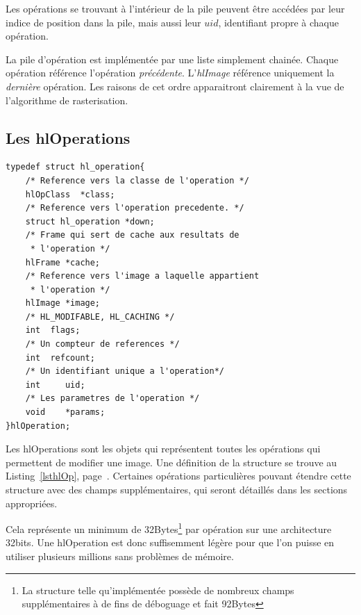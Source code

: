 			Les opérations se trouvant à l'intérieur de la pile peuvent être accédées par leur indice de position dans la pile, mais aussi leur
			$uid$, identifiant propre à chaque opération. 

			La pile d'opération est implémentée par une liste simplement chainée. Chaque opération référence l'opération \emph{précédente}.
			L'\emph{hlImage} référence uniquement la \emph{dernière} opération. Les raisons de cet ordre apparaitront clairement à la vue
			de l'algorithme de rasterisation.

		\subsection{Les hlOperations}
		\begin{lstlisting}[float,caption={Définition des hlOperations },frame=tb,label=lsthlOp]
typedef struct hl_operation{
	/* Reference vers la classe de l'operation */
	hlOpClass  *class;	
	/* Reference vers l'operation precedente. */
	struct hl_operation *down;
	/* Frame qui sert de cache aux resultats de 
	 * l'operation */
	hlFrame *cache;			
	/* Reference vers l'image a laquelle appartient 
	 * l'operation */
	hlImage *image;			
	/* HL_MODIFABLE, HL_CACHING */
	int	 flags;			
	/* Un compteur de references */
	int	 refcount;		
	/* Un identifiant unique a l'operation*/
	int 	uid;
	/* Les parametres de l'operation */
	void	*params;		
}hlOperation;
		\end{lstlisting}

		Les hlOperations sont les objets qui représentent toutes les opérations qui permettent de modifier une image. Une définition de la structure
		se trouve au Listing~\ref{lsthlOp}, page~\pageref{lsthlOp}. Certaines opérations particulières pouvant étendre cette structure avec des
		champs supplémentaires, qui seront détaillés dans les sections appropriées.

		Cela représente un minimum de 32Bytes\footnote{La structure telle qu'implémentée possède de nombreux champs supplémentaires à de fins de déboguage et fait
		92Bytes} par opération sur une architecture 32bits. Une hlOperation est donc suffisemment légère pour
		que l'on puisse en utiliser plusieurs millions sans problèmes de mémoire. 

